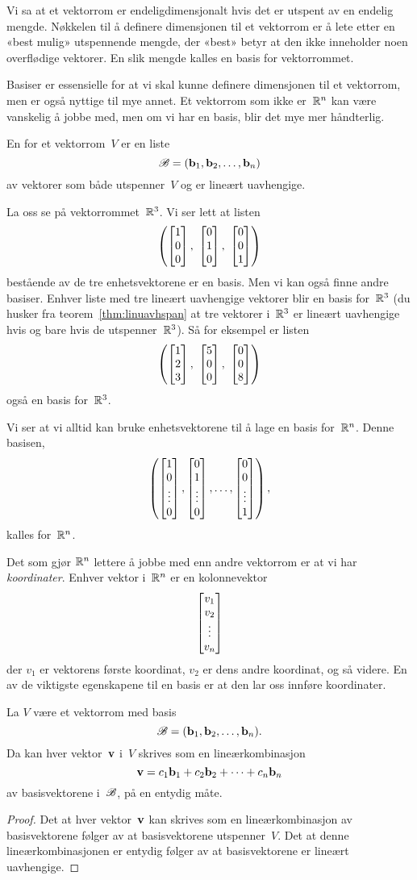 Vi sa at et vektorrom er endeligdimensjonalt hvis det er utspent av en
endelig mengde.  Nøkkelen til å definere dimensjonen til et vektorrom
er å lete etter en «best mulig» utspennende mengde, der «best» betyr
at den ikke inneholder noen overflødige vektorer.  En slik mengde
kalles en basis for vektorrommet.

Basiser er essensielle for at vi skal kunne definere dimensjonen til
et vektorrom, men er også nyttige til mye annet.  Et vektorrom som
ikke er~$\mathbb{R}^n$ kan være vanskelig å jobbe med, men om vi har en basis,
blir det mye mer håndterlig.

\begin{defn}
En  for et vektorrom~$V$ er en liste
\[
\mathscr{B} = (\mathbf{b}_1, \mathbf{b}_2, \ldots, \mathbf{b}_n)
\]
av vektorer som både utspenner~$V$ og er lineært uavhengige.
\end{defn}


\begin{ex}
La oss se på vektorrommet~$\mathbb{R}^3$.
Vi ser lett at listen
\[
\left(
\vvv{1}{0}{0},\ %
\vvv{0}{1}{0},\ %
\vvv{0}{0}{1}
\right)
\]
bestående av de tre enhetsvektorene er en basis.  Men vi kan også
finne andre basiser.  Enhver liste med tre lineært uavhengige vektorer
blir en basis for~$\mathbb{R}^3$ (du husker fra teorem~\ref{thm:linuavhspan}
at tre vektorer i~$\mathbb{R}^3$ er lineært uavhengige hvis og bare hvis de
utspenner~$\mathbb{R}^3$).  Så for eksempel er listen
\[
\left(
\vvv{1}{2}{3},\ %
\vvv{5}{0}{0},\ %
\vvv{0}{0}{8}
\right)
\]
også en basis for~$\mathbb{R}^3$.
\end{ex}

Vi ser at vi alltid kan bruke enhetsvektorene til å lage en basis
for~$\mathbb{R}^n$.  Denne basisen,
\[
\left(
\begin{bmatrix} 1 \\ 0 \\ \vdots \\ 0 \end{bmatrix},
\begin{bmatrix} 0 \\ 1 \\ \vdots \\ 0 \end{bmatrix},
\ldots,
\begin{bmatrix} 0 \\ 0 \\ \vdots \\ 1 \end{bmatrix}
\right),
\]
kalles  for~$\mathbb{R}^n$.

Det som gjør $\mathbb{R}^n$ lettere å jobbe med enn andre vektorrom er at vi
har \emph{koordinater}.  Enhver vektor i~$\mathbb{R}^n$ er en kolonnevektor
\[
\begin{bmatrix} v_1 \\ v_2 \\ \vdots \\ v_n \end{bmatrix}
\]
der $v_1$ er vektorens første koordinat, $v_2$ er dens andre
koordinat, og så videre.  En av de viktigste egenskapene til en basis
er at den lar oss innføre koordinater.

\begin{thm}
\label{thm:koordinater}
La $V$ være et vektorrom med basis
\[
\mathscr{B} = (\mathbf{b}_1, \mathbf{b}_2, \ldots, \mathbf{b}_n).
\]
Da kan hver vektor~$\mathbf{v}$ i~$V$ skrives som en lineærkombinasjon
\[
\mathbf{v} = c_1 \mathbf{b}_1 + c_2 \mathbf{b}_2 + \cdots + c_n \mathbf{b}_n
\]
av basisvektorene i~$\mathscr{B}$, på en entydig måte.
\end{thm}
\begin{proof}
Det at hver vektor~$\mathbf{v}$ kan skrives som en lineærkombinasjon av
basisvektorene følger av at basisvektorene utspenner~$V$.  Det at
denne lineærkombinasjonen er entydig følger av at basisvektorene er
lineært uavhengige.
\end{proof}

